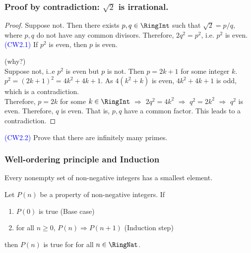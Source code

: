  \begin{frame}[fragile]
\frametitle{Proof by contradiction: $\sqrt{2}$ is irrational.}

\begin{proof}
Suppose not. Then there exists $p,q \in \RingInt$ such that $\sqrt{2}=p/q,$ where $p,q$ do not have any common divisors. Therefore, $2q^2 = p^2$, i.e. $p^2$ is even. \\

\textcolor{blue}{(CW2.1)} If $p^2$ is even, then $p$ is even. 


(why?) \\
Suppose not, i..e $p^2$ is even but $p$ is not. Then $p = 2k +1$ for some integer $k$. $p^2 = (2k+1)^2=
4k^2+4k +1$. As $4(k^2+k)$ is even,  $4k^2+4k +1$ is odd, which is a contradiction.\\



Therefore, $p=2k$ for some $k \in \RingInt$ $\Rightarrow$ $2q^2 = 4k^2$ $\Rightarrow$ $q^2 = 2k^2$ $\Rightarrow$ $q^2$ is even. Therefore, $q$ is even. That is, $p,q$ have a common factor. This leads to a contradiction.  
\end{proof}

\textcolor{blue}{(CW2.2)} Prove that there are infinitely many primes.
\end{frame}

 \begin{frame}[fragile]
\frametitle{Well-ordering principle and Induction}
\begin{axiom}[WOP]
Every nonempty set of non-negative integers has a smallest element. 
\end{axiom}


\begin{axiom}[Induction]
Let $P(n)$ be a property of non-negative integers. If 
\begin{enumerate}
\item $P(0)$ is true (Base case)
\item for all $n \geq 0$, $P(n) \Rightarrow P(n+1)$ (Induction step)
\end{enumerate}
then $P(n)$ is true for for all $n \in \RingNat$.
\end{axiom}

\end{frame}


